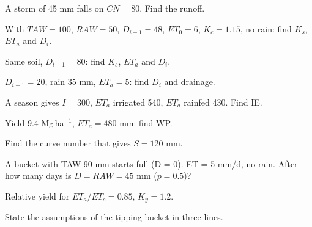 \begin{exlist}
\item A storm of 45 mm falls on $CN=80$. Find the runoff.\exans{10.9 mm}
\item With $TAW=100$, $RAW=50$, $D_{i-1}=48$, $ET_0=6$, $K_c=1.15$, no rain: find $K_s$, $ET_a$ and $D_i$.
\item Same soil, $D_{i-1}=80$: find $K_s$, $ET_a$ and $D_i$.
\item $D_{i-1}=20$, rain 35 mm, $ET_a=5$: find $D_i$ and drainage.
\item A season gives $I=300$, $ET_a$ irrigated 540, $ET_a$ rainfed 430. Find IE.
\item Yield 9.4 Mg\,ha$^{-1}$, $ET_a=480$ mm: find WP.
\item Find the curve number that gives $S=120$ mm.
\item A bucket with TAW 90 mm starts full (D = 0). ET = 5 mm/d, no rain. After how many days is $D=RAW=45$ mm ($p=0.5$)?
\item Relative yield for $ET_a/ET_c=0.85$, $K_y=1.2$.
\item State the assumptions of the tipping bucket in three lines.
\end{exlist}
